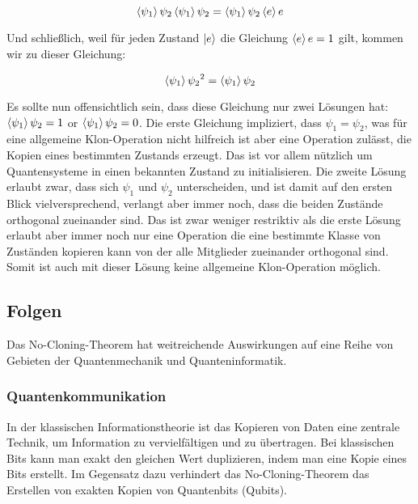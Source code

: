 \begin{equation}
    \braket{\psi_1}{\psi_2}\braket{\psi_1}{\psi_2}=\braket{\psi_1}{\psi_2}\braket{e}{e}
    \label{eq:scalar_equals}
\end{equation}

Und schließlich, weil für jeden Zustand $\ket{e}$ die Gleichung $\braket{e}{e} = 1$ gilt, kommen wir zu dieser Gleichung:

\begin{equation}
    \braket{\psi_1}{\psi_2}^2 = \braket{\psi_1}{\psi_2}
    \label{eq:square_equals_single}
\end{equation}

Es sollte nun offensichtlich sein, dass diese Gleichung nur zwei Lösungen hat:
$\braket{\psi_1}{\psi_2} = 1$ or $\braket{\psi_1}{\psi_2} = 0$.
Die erste Gleichung impliziert, dass $\psi_1 = \psi_2$, was für eine allgemeine Klon-Operation nicht hilfreich ist aber eine
Operation zulässt, die Kopien eines bestimmten Zustands erzeugt.
Das ist vor allem nützlich um Quantensysteme in einen bekannten Zustand zu initialisieren.
Die zweite Lösung erlaubt zwar, dass sich $\psi_1$ und $\psi_2$ unterscheiden, und ist damit auf den ersten Blick
vielversprechend, verlangt aber immer noch, dass die beiden Zustände orthogonal zueinander sind.
Das ist zwar weniger restriktiv als die erste Lösung erlaubt aber immer noch nur eine Operation die eine bestimmte Klasse
von Zuständen kopieren kann von der alle Mitglieder zueinander orthogonal sind.
Somit ist auch mit dieser Lösung keine allgemeine Klon-Operation möglich.
\subsection{Folgen}\label{subsec:implications}
Das No-Cloning-Theorem hat weitreichende Auswirkungen auf eine Reihe von Gebieten der
Quantenmechanik und Quanteninformatik.

\subsubsection{Quantenkommunikation}
In der klassischen Informationstheorie ist das Kopieren von Daten eine zentrale Technik, um Information zu vervielfältigen und zu übertragen.
Bei klassischen Bits kann man exakt den gleichen Wert duplizieren, indem man eine Kopie eines Bits erstellt.
Im Gegensatz dazu verhindert das No-Cloning-Theorem das Erstellen von exakten Kopien von Quantenbits (Qubits).\\

